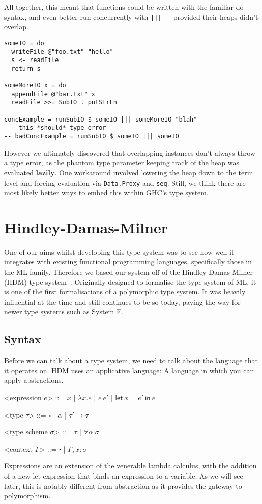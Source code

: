 All together, this meant that functions could be written with the
familiar do syntax, and even better run concurrently with
\texttt{|||} --- provided their heaps didn't overlap.
\begin{verbatim}
someIO = do
  writeFile @"foo.txt" "hello"
  s <- readFile
  return s

someMoreIO x = do
  appendFile @"bar.txt" x
  readFile >>= SubIO . putStrLn

concExample = runSubIO $ someIO ||| someMoreIO "blah"
--- this *should* type error
-- badConcExample = runSubIO $ someIO ||| someIO
\end{verbatim}
However we ultimately discovered that overlapping instances don't
always throw a type error, as the phantom type parameter keeping track
of the heap was evaluated \textbf{lazily}. One workaround involved
lowering the heap down to the term level and forcing evaluation via
\texttt{Data.Proxy} and \texttt{seq}. Still,
we think there are most likely better ways to embed this within GHC's
type system.

\section{Hindley-Damas-Milner}
One of our aims whilst developing this type system was to see how well
it integrates with existing functional programming languages,
specifically those in the ML family. Therefore we based our system off
of the Hindley-Damas-Milner (HDM) type
system~\cite{damas1982}. Originally designed to formalise the type
system of ML, it is one of the first formalisations of a polymorphic
type system. It was heavily influential at the time and still
continues to be so today, paving the way for newer type systems such
as System F.

\subsection{Syntax}
Before we can talk about a type system, we need to talk about the
language that it operates on. HDM uses an applicative language: A
language in which you can apply abstractions.
\def\defaultHypSeparation{\hskip .05in}
\newcommand{\letin}[2]{\mathsf{let} \ #1 \ \mathsf{in} \ #2}
\begin{grammar}
  <expression $e$> ::= $x$ | $\lambda x . e$ | $e \ e'$ | $\letin{x=e'}{e}$ %

  <type $\tau$> ::= $\square$ | $\alpha$ | $\tau' \rightarrow \tau$
  
  <type scheme $\sigma$> ::= $\tau$ | $\forall \alpha . \sigma$

  <context $\Gamma$> ::= $\centerdot$ | $\Gamma, x : \sigma$
\end{grammar}
Expressions are an extension of the venerable lambda calculus, with the
addition of a new let expression that binds an expression to a
variable. As we will see later, this is notably different from
abstraction as it provides the gateway to polymorphism.

